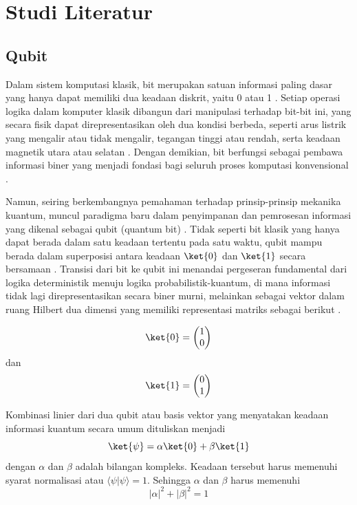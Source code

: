 \chapter{Studi Literatur}

\section{Qubit}
\par
Dalam sistem komputasi klasik, bit merupakan satuan informasi paling dasar yang hanya dapat memiliki dua keadaan diskrit, yaitu 0 atau 1 \cite{nielsen2010quantum}. Setiap operasi logika dalam komputer klasik dibangun dari manipulasi terhadap bit-bit ini, yang secara fisik dapat direpresentasikan oleh dua kondisi berbeda, seperti arus listrik yang mengalir atau tidak mengalir, tegangan tinggi atau rendah, serta keadaan magnetik utara atau selatan \cite{tanenbaum2013structured}. Dengan demikian, bit berfungsi sebagai pembawa informasi biner yang menjadi fondasi bagi seluruh proses komputasi konvensional \cite{shannon1948mathematical}.
\par
Namun, seiring berkembangnya pemahaman terhadap prinsip-prinsip mekanika kuantum, muncul paradigma baru dalam penyimpanan dan pemrosesan informasi yang dikenal sebagai qubit (quantum bit) \cite{nielsen2010quantum}. Tidak seperti bit klasik yang hanya dapat berada dalam satu keadaan tertentu pada satu waktu, qubit mampu berada dalam superposisi antara keadaan $\ket{0}$ dan $\ket{1}$ secara bersamaan \cite{dirac1981principles}. Transisi dari bit ke qubit ini menandai pergeseran fundamental dari logika deterministik menuju logika probabilistik-kuantum, di mana informasi tidak lagi direpresentasikan secara biner murni, melainkan sebagai vektor dalam ruang Hilbert dua dimensi yang memiliki representasi matriks sebagai berikut \cite{sakurai2017modern}.

\begin{equation}
    \ket{0} = \begin{pmatrix} 1 \\ 0 \end{pmatrix}
\end{equation}
dan
\begin{equation}
    \ket{1} = \begin{pmatrix} 0 \\ 1 \end{pmatrix}
\end{equation}
\par
Kombinasi linier dari dua qubit atau basis vektor yang menyatakan keadaan informasi kuantum secara umum dituliskan menjadi
\begin{equation}
\ket{\psi} = \alpha \ket{0} + \beta \ket{1}\label{keadaanumum}
\end{equation}
dengan $\alpha$ dan $\beta$ adalah bilangan kompleks. Keadaan tersebut harus memenuhi syarat normalisasi atau $\langle \psi | \psi \rangle = 1$. Sehingga $\alpha$ dan $\beta$ harus memenuhi
\begin{equation}
|\alpha|^2 + |\beta|^2 = 1
\end{equation}

